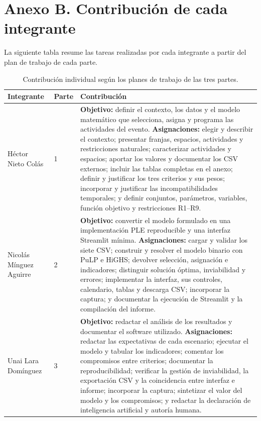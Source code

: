 \clearpage
\section*{Anexo B. Contribución de cada integrante}

La siguiente tabla resume las tareas realizadas por cada integrante a partir
del plan de trabajo de cada parte.

\begin{table}[htbp]
\centering
\renewcommand{\arraystretch}{1.2}
\begin{tabular}{p{}p{}p{}}
\toprule
\textbf{Integrante} & \textbf{Parte} & \textbf{Contribución} \\
\midrule
Héctor Nieto Colás & 1 &
\textbf{Objetivo:} definir el contexto, los datos y el modelo matemático que
selecciona, asigna y programa las actividades del evento.
\newline
\textbf{Asignaciones:} elegir y describir el contexto; presentar franjas,
espacios, actividades y restricciones naturales; caracterizar actividades y
espacios; aportar los valores y documentar los CSV externos; incluir las tablas
completas en el anexo; definir y justificar los tres criterios y sus pesos;
incorporar y justificar las incompatibilidades temporales; y definir conjuntos,
parámetros, variables, función objetivo y restricciones R1--R9. \\
\midrule
Nicolás Mínguez Aguirre & 2 &
\textbf{Objetivo:} convertir el modelo formulado en una implementación PLE
reproducible y una interfaz Streamlit mínima.
\newline
\textbf{Asignaciones:} cargar y validar los siete CSV; construir y resolver el
modelo binario con PuLP e HiGHS; devolver selección, asignación e indicadores;
distinguir solución óptima, inviabilidad y errores; implementar la interfaz,
sus controles, calendario, tablas y descarga CSV; incorporar la captura; y
documentar la ejecución de Streamlit y la compilación del informe. \\
\midrule
Unai Lara Domínguez & 3 &
\textbf{Objetivo:} redactar el análisis de los resultados y documentar el
software utilizado.
\newline
\textbf{Asignaciones:} redactar las expectativas de cada escenario; ejecutar
el modelo y tabular los indicadores; comentar los compromisos entre criterios;
documentar la reproducibilidad; verificar la gestión de inviabilidad, la
exportación CSV y la coincidencia entre interfaz e informe; incorporar la
captura; sintetizar el valor del modelo y los compromisos; y redactar la
declaración de inteligencia artificial y autoría humana. \\
\bottomrule
\end{tabular}
\caption{Contribución individual según los planes de trabajo de las tres partes.}
\end{table}
